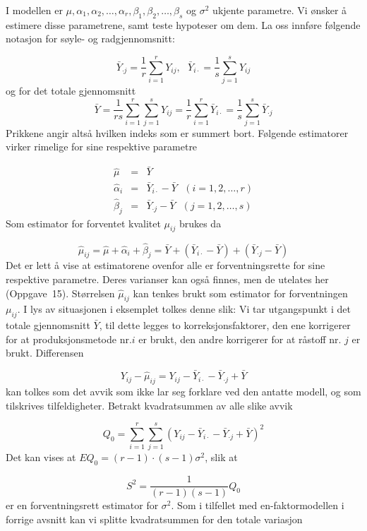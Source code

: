 I modellen er $\mu, {\alpha}_1, {\alpha}_2, \ldots, {\alpha}_r,
{\beta}_1, {\beta}_2, \ldots, {\beta}_s$ og ${\sigma}^2$ ukjente
parametre.  Vi ønsker å estimere disse parametrene, samt teste
hypoteser om dem.  La oss innføre følgende notasjon for søyle- og
radgjennomsnitt:

\[ \bar{Y}_{\cdot j}=\frac{1}{r}\sum_{i=1}^{r}Y_{ij},  \mbox{\ \ \ }
              \bar{Y}_{i\cdot}=\frac{1}{s}\sum_{j=1}^{s}Y_{ij} \]
og for det totale gjennomsnitt
\[ \bar{Y}=\frac{1}{rs}\sum_{i=1}^{r}\sum_{j=1}^{s}Y_{ij}=
            \frac{1}{r}\sum_{i=1}^{r}\bar{Y}_{i\cdot}=
            \frac{1}{s}\sum_{j=1}^{s}\bar{Y}_{\cdot j} \]
Prikkene angir altså hvilken indeks som er summert bort.  Følgende
estimatorer virker rimelige for sine respektive parametre

\begin{eqnarray*}
  \hat{\mu}     & = & \bar{Y} \\
{\hat{\alpha}}_i & = & \bar{Y}_{i\cdot}-\bar{Y} \mbox{\ \ }(i=1,2,\ldots,r)\\
{\hat{\beta}}_j  & = & \bar{Y}_{\cdot j}-\bar{Y} \mbox{\ \ }(j=1,2,\ldots,s)
\end{eqnarray*}
Som estimator for forventet kvalitet $\mu_{ij}$ brukes da 

\[ {\hat{\mu}}_{ij}=\hat{\mu}+{\hat{\alpha}_i}+{\hat{\beta}_j}=
  \bar{Y}+({\bar{Y}}_{i\cdot}-\bar{Y})+({\bar{Y}}_{\cdot j}-\bar{Y}) \]
Det er lett å vise at estimatorene ovenfor alle er forventningsrette
for sine respektive parametre.  Deres varianser kan også finnes, men de
utelates her (Oppgave~15).  Størrelsen ${\hat{\mu}}_{ij}$
kan tenkes brukt som estimator for forventningen $\mu_{ij}$.  I lys
av situasjonen i eksemplet tolkes denne slik:  Vi tar utgangspunkt i
det totale gjennomsnitt $\bar{Y}$, til dette legges to 
korreksjonsfaktorer, den ene korrigerer for at produksjonsmetode nr.$i$
er brukt, den andre korrigerer for at råstoff nr. $j$ er brukt.
Differensen

\[ Y_{ij}-{\hat{\mu}}_{ij}=Y_{ij}-{\bar{Y}}_{i\cdot }-
                          {\bar{Y}}_{\cdot j}+\bar{Y} \]
kan tolkes som det avvik som ikke lar seg forklare ved den antatte
modell, og som tilskrives tilfeldigheter.  Betrakt 
kvadratsummen av alle slike avvik

\[  Q_0=\sum_{i=1}^{r}\sum_{j=1}^s
          {(Y_{ij}-{\bar{Y}}_{i\cdot}-{\bar{Y}}_{\cdot j}+\bar{Y})}^2 \]
Det kan vises at $EQ_0 = (r-1)\cdot (s-1){\sigma}^2$, slik at

\[ S^2=\frac{1}{(r-1)(s-1)}Q_0           \]
er en forventningsrett estimator for ${\sigma}^2$.  Som i 
tilfellet med en-faktormodellen i forrige avsnitt kan vi splitte 
kvadratsummen for den totale variasjon

